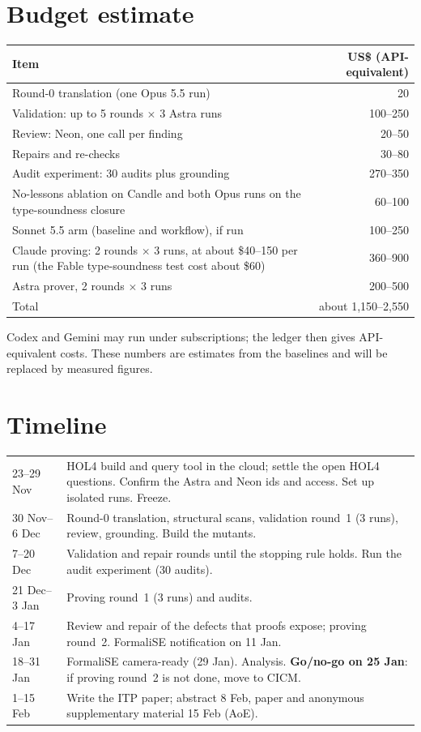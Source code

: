 \documentclass[11pt,a4paper]{article}
\begin{document}
\section{Budget estimate}
\begin{tabularx}{\textwidth}{@{}Xr@{}}
\toprule
Item & US\$ (API-equivalent)\\
\midrule
Round-0 translation (one Opus 5.5 run) & 20\\
Validation: up to 5 rounds $\times$ 3 Astra runs & 100--250\\
Review: Neon, one call per finding & 20--50\\
Repairs and re-checks & 30--80\\
Audit experiment: 30 audits plus grounding & 270--350\\
No-lessons ablation on Candle and both Opus runs on the type-soundness closure & 60--100\\
Sonnet 5.5 arm (baseline and workflow), if run & 100--250\\
Claude proving: 2 rounds $\times$ 3 runs, at about \$40--150 per run (the Fable type-soundness test cost about \$60) & 360--900\\
Astra prover, 2 rounds $\times$ 3 runs & 200--500\\
\midrule
Total & about 1{,}150--2{,}550\\
\bottomrule
\end{tabularx}

\medskip\noindent Codex and Gemini may run under subscriptions; the ledger then gives API-equivalent costs. These numbers are estimates from the baselines and will be replaced by measured figures.

\section{Timeline}
\begin{tabularx}{\textwidth}{@{}lX@{}}
\toprule
23--29 Nov & HOL4 build and query tool in the cloud; settle the open HOL4 questions. Confirm the Astra and Neon ids and access. Set up isolated runs. Freeze.\\
30 Nov--6 Dec & Round-0 translation, structural scans, validation round~1 (3 runs), review, grounding. Build the mutants.\\
7--20 Dec & Validation and repair rounds until the stopping rule holds. Run the audit experiment (30 audits).\\
21 Dec--3 Jan & Proving round~1 (3 runs) and audits.\\
4--17 Jan & Review and repair of the defects that proofs expose; proving round~2. FormaliSE notification on 11 Jan.\\
18--31 Jan & FormaliSE camera-ready (29 Jan). Analysis. \textbf{Go/no-go on 25 Jan}: if proving round~2 is not done, move to CICM.\\
1--15 Feb & Write the ITP paper; abstract 8 Feb, paper and anonymous supplementary material 15 Feb (AoE).\\
\bottomrule
\end{tabularx}
\end{document}
